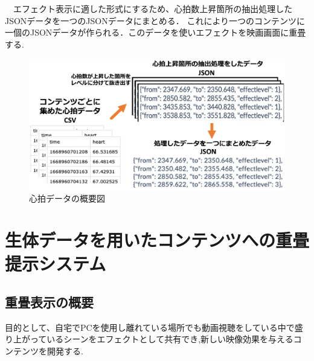 　エフェクト表示に適した形式にするため、心拍数上昇箇所の抽出処理したJSONデータを一つのJSONデータにまとめる．
これにより一つのコンテンツに一個のJSONデータが作られる．このデータを使いエフェクトを映画画面に重畳する.

\begin{figure}[H]
    \centering
    \includegraphics[width=16cm]{images/chapter3/system.png}
    \caption{心拍データの概要図}
\end{figure}







\section{生体データを用いたコンテンツへの重畳提示システム}
\subsection{重畳表示の概要}
目的として、自宅でPCを使用し離れている場所でも動画視聴をしている中で盛り上がっているシーンをエフェクトとして共有でき,新しい映像効果を与えるコンテンツを開発する.


